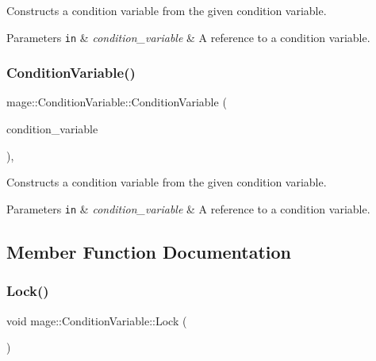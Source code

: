 Constructs a condition variable from the given condition variable.


\begin{DoxyParams}[1]{Parameters}
\mbox{\tt in}  & {\em condition\+\_\+variable} & A reference to a condition variable. \\
\hline
\end{DoxyParams}
\hypertarget{classmage_1_1_condition_variable_a225e5144abef5b2ba1d8393777f1c4f1}{}\label{classmage_1_1_condition_variable_a225e5144abef5b2ba1d8393777f1c4f1} 
\subsubsection{\texorpdfstring{Condition\+Variable()}{ConditionVariable()}\hspace{0.1cm}{\footnotesize\ttfamily [3/3]}}
{\footnotesize\ttfamily mage\+::\+Condition\+Variable\+::\+Condition\+Variable (\begin{DoxyParamCaption}\item[{\hyperlink{classmage_1_1_condition_variable}{Condition\+Variable} \&\&}]{condition\+\_\+variable }\end{DoxyParamCaption})\hspace{0.3cm}{\ttfamily [private]}, {\ttfamily [delete]}}

Constructs a condition variable from the given condition variable.


\begin{DoxyParams}[1]{Parameters}
\mbox{\tt in}  & {\em condition\+\_\+variable} & A reference to a condition variable. \\
\hline
\end{DoxyParams}


\subsection{Member Function Documentation}
\hypertarget{classmage_1_1_condition_variable_acb0fa4a842b6979ac35c70dab0f43813}{}\label{classmage_1_1_condition_variable_acb0fa4a842b6979ac35c70dab0f43813} 
\subsubsection{\texorpdfstring{Lock()}{Lock()}}
{\footnotesize\ttfamily void mage\+::\+Condition\+Variable\+::\+Lock (\begin{DoxyParamCaption}{ }\end{DoxyParamCaption})}

